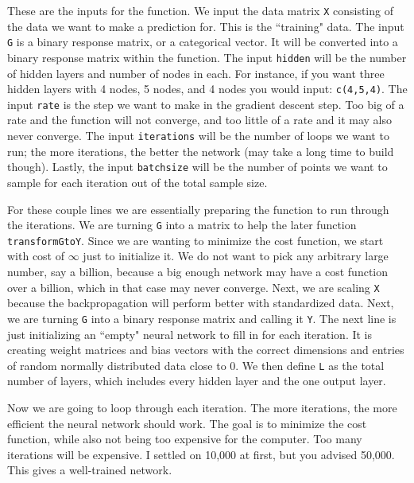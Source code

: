 \documentclass[12pt,letterpaper]{article}
\begin{document}
\begin{enumerate}
These are the inputs for the function. We input the data matrix \texttt{X} consisting of the data we want to make a prediction for. This is the ``training" data. The input \texttt{G} is a binary response matrix, or a categorical vector. It will be converted into a binary response matrix within the function. The input \texttt{hidden} will be the number of hidden layers and number of nodes in each. For instance, if you want three hidden layers with 4 nodes, 5 nodes, and 4 nodes you would input: \texttt{c(4,5,4)}. The input \texttt{rate} is the step we want to make in the gradient descent step. Too big of a rate and the function will not converge, and too little of a rate and it may also never converge. The input \texttt{iterations} will be the number of loops we want to run; the more iterations, the better the network (may take a long time to build though). Lastly, the input \texttt{batchsize} will be the number of points we want to sample for each iteration out of the total sample size.



For these couple lines we are essentially preparing the function to run through the iterations. We are turning \texttt{G} into a matrix to help the later function \texttt{transformGtoY}. Since we are wanting to minimize the cost function, we start with  cost of $\infty$ just to initialize it. We do not want to pick any arbitrary large number, say a billion, because a big enough network may have a cost function over a billion, which in that case may never converge. Next, we are scaling \texttt{X} because the backpropagation will perform better with standardized data. Next, we are turning \texttt{G} into a binary response matrix and calling it \texttt{Y}. The next line is just initializing an ``empty" neural network to fill in for each iteration. It is creating weight matrices and bias vectors with the correct dimensions and entries of random normally distributed data close to 0. We then define \texttt{L} as the total number of layers, which includes every hidden layer and the one output layer.



Now we are going to loop through each iteration. The more iterations, the more efficient the neural network should work. The goal is to minimize the cost function, while also not being too expensive for the computer. Too many iterations will be expensive. I settled on 10,000 at first, but you advised 50,000. This gives a well-trained network.


\end{enumerate}
\end{document}
